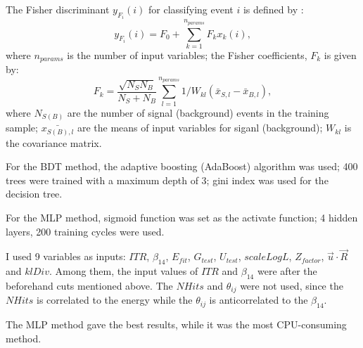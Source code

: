The Fisher discriminant $y_{F_i}(i)$ for classifying event $i$ is defined by \cite{tmvaWebsite}:
\begin{equation}
y_{F_i}(i) = F_0+\sum_{k=1}^{n_{params}}F_k x_k(i),
\end{equation}
where $n_{params}$ is the number of input variables; the Fisher coefficients, $F_k$ is given by:
\begin{equation}
F_k = \frac{\sqrt{N_SN_B}}{N_S+N_B}\sum_{l=1}^{n_{params}}1/W_{kl}(\bar{x}_{S,l}-\bar{x}_{B,l}),
\end{equation} 
where $N_{S(B)}$ are the number of signal (background) events in the training sample; $\bar{x_{S(B),l}}$ are the means of input variables for siganl (background); $W_{kl}$ is the covariance matrix\cite{tmvaWebsite}.

For the BDT method, the adaptive boosting (AdaBoost) algorithm was used; 400 trees were trained with a maximum depth of 3; gini index was used for the decision tree.

For the MLP method, sigmoid function was set as the activate function; 4 hidden layers, 200 training cycles were used.

I used 9 variables as inputs: $ITR$, $\beta_{14}$, $E_{fit}$, $G_{test}$, $U_{test}$, $scaleLogL$, $Z_{factor}$, $\vec{u}\cdot \vec{R}$ and $klDiv$. Among them, the input values of $ITR$ and $\beta_{14}$ were after the beforehand cuts mentioned above. The $NHits$ and $\theta_{ij}$ were not used, since the $NHits$ is correlated to the energy while the $\theta_{ij}$ is anticorrelated to the $\beta_{14}$.

The MLP method gave the best results, while it was the most CPU-consuming method.

